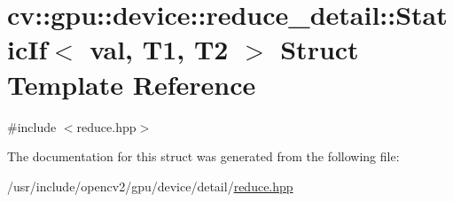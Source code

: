 \hypertarget{structcv_1_1gpu_1_1device_1_1reduce__detail_1_1StaticIf}{\section{cv\-:\-:gpu\-:\-:device\-:\-:reduce\-\_\-detail\-:\-:Static\-If$<$ val, T1, T2 $>$ Struct Template Reference}
\label{structcv_1_1gpu_1_1device_1_1reduce__detail_1_1StaticIf}
}


{\ttfamily \#include $<$reduce.\-hpp$>$}



The documentation for this struct was generated from the following file\-:\begin{DoxyCompactItemize}
\item 
/usr/include/opencv2/gpu/device/detail/\hyperlink{detail_2reduce_8hpp}{reduce.\-hpp}\end{DoxyCompactItemize}
